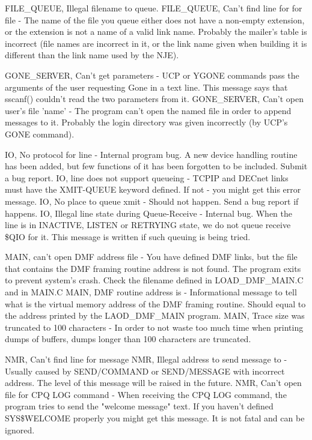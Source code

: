 \hfill\break
{\ncrBold FILE\_QUEUE, Illegal filename to queue.}
\hfill\break
{\ncrBold FILE\_QUEUE,  Can't  find  line  for  for file }
- The name of the file you
queue either does not have a non-empty extension, or  the  extension  is
not  a  name  of  a  valid  link  name.  Probably  the mailer's table is
incorrect (file names are incorrect in it, or the link name  given  when
building it is different than the link name used by the NJE).

\hfill\break
{\ncrBold GONE\_SERVER,  Can't  get  parameters  -  }
UCP  or YGONE commands pass the
arguments of the user requesting Gone in a text line. This message  says
that sscanf() couldn't read the two parameters from it.
\hfill\break
{\ncrBold GONE\_SERVER,  Can't open user's file 'name' }
- The program can't open the
named file in order  to  append  messages  to  it.  Probably  the  login
directory was given incorrectly (by UCP's GONE command).

\hfill\break
{\ncrBold IO,  No  protocol  for  line  }
-  Internal  program  bug.  A  new  device
handling routine has been added,  but  few  functions  of  it  has  been
forgotten to be included. Submit a bug report.
\hfill\break
{\ncrBold IO,  line  does  not support queueing }
- TCPIP and DECnet links must have
the XMIT-QUEUE keyword defined. If  not  -  you  might  get  this  error
message.
\hfill\break
{\ncrBold IO,  No  place  to  queue xmit }
- Should not happen. Send a bug report if
happens.
\hfill\break
{\ncrBold IO, Illegal line state during Queue-Receive -}
Internal  bug.  When  the
line  is  in INACTIVE, LISTEN or RETRYING state, we do not queue receive
\$QIO for it. This message is written if such queuing is being tried.

\hfill\break
{\ncrBold MAIN, can't open DMF address file }
- You have defined DMF links, but  the
file  that  contains  the  DMF framing routine address is not found. The
program exits to prevent system's crash. Check the filename  defined  in
LOAD\_DMF\_MAIN.C and in MAIN.C
\hfill\break
{\ncrBold MAIN, DMF routine address is }
- Informational message to tell what is the
virtual memory address of the DMF framing routine. Should equal  to  the
address printed by the LAOD\_DMF\_MAIN program.
\hfill\break
{\ncrBold MAIN, Trace size was truncated to 100 characters }
- In order to not waste
too much time when printing dumps of  buffers,  dumps  longer  than  100
characters are truncated.

\hfill\break
{\ncrBold NMR, Can't find line for message}
\hfill\break
{\ncrBold NMR, Illegal address to send message to }
- Usually caused by SEND/COMMAND
or SEND/MESSAGE with incorrect address. The level of this  message  will
be raised in the future.
\hfill\break
{\ncrBold NMR,  Can't  open  file for CPQ LOG command }
- When receiving the CPQ LOG
command, the program tries to send the "welcome message"  text.  If  you
haven't  defined  SYS\$WELCOME properly you might get this message. It is
not fatal and can be ignored.

